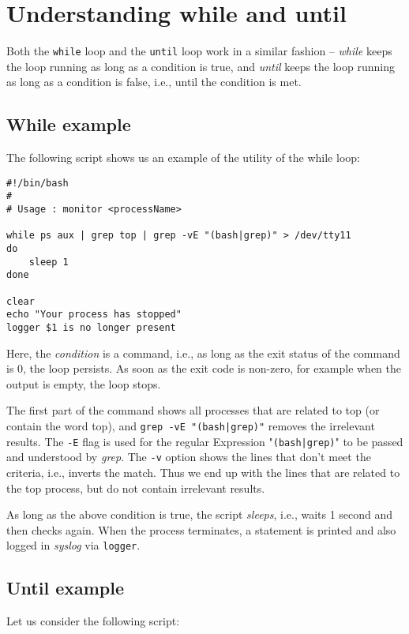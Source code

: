 \section{Understanding while and until}
Both the \verb|while| loop and the \verb|until| loop work in a similar fashion -- \textit{while} keeps the loop running as long as a condition is true, and \textit{until} keeps the loop running as long as a condition is false, i.e., until the condition is met. 

\subsection{While example}
The following script shows us an example of the utility of the while loop:

\vspace{-15pt}
\begin{verbatim}
#!/bin/bash
#
# Usage : monitor <processName> 

while ps aux | grep top | grep -vE "(bash|grep)" > /dev/tty11
do
	sleep 1
done

clear
echo "Your process has stopped"
logger $1 is no longer present
\end{verbatim}
\vspace{-10pt}	

\noindent
Here, the \textit{condition} is a command, i.e., as long as the exit status of the command is 0, the loop persists. As soon as the exit code is non-zero, for example when the output is empty, the loop stops. 

The first part of the command shows all processes that are related to top (or contain the word top), and \verb~grep -vE "(bash|grep)"~ removes the irrelevant results. The \verb|-E| flag is used for the regular Expression "\verb~(bash|grep)~" to be passed and understood by \textit{grep}. The \verb|-v| option shows the lines that don't meet the criteria, i.e., inverts the match. Thus we end up with the lines that are related to the top process, but do not contain irrelevant results. 

As long as the above condition is true, the script \textit{sleeps}, i.e., waits 1 second and then checks again. When the process terminates, a statement is printed and also logged in \textit{syslog} via \verb|logger|. 

\subsection{Until example}
Let us consider the following script:

